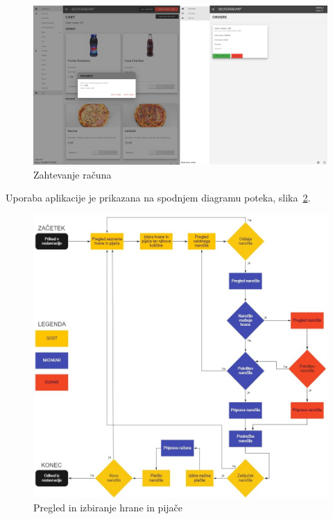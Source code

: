 \documentclass[a4paper, 12pt]{book}
\begin{document}
\begin{figure}[!htb]
\begin{center}
\includegraphics[width=14.5cm]{opis6.jpg}
\caption{Zahtevanje računa}
\label{Opis6}
\end{center}
\end{figure}

Uporaba aplikacije je prikazana na spodnjem diagramu poteka, slika~\ref{Diagram1}.
\begin{figure}[!htb]
\begin{center}
\includegraphics[width=13cm]{Diagram_poteka.jpg}
\caption{Pregled in izbiranje hrane in pijače}
\label{Diagram1}
\end{center}
\end{figure}
\end{document}
